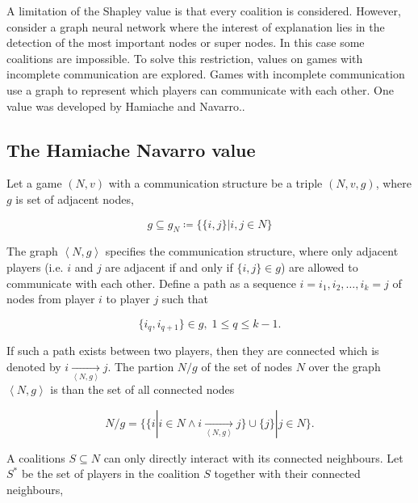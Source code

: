 \documentclass[twoside,twocolumn,9pt]{article}
\begin{document}
A limitation of the Shapley value is that every coalition is considered.\cite{zhang2022gstarx} 
However, consider a graph neural network where the interest of explanation lies in the detection 
of the most important nodes or super nodes. In this case some coalitions are impossible. To solve 
this restriction, values on games with incomplete communication\cite{myerson1977graphs} are explored. 
Games with incomplete communication use a graph to represent which players can communicate with each other.
One value was developed by Hamiache and Navarro.\cite{hamiache_value_1999, hamiache_associated_2020}.

\subsection{The Hamiache Navarro value}

Let a game $(N, v)$ with a communication structure be a triple $(N, v, g)$, where $g$ is
set of adjacent nodes\cite{hamiache_value_1999},

\begin{equation}
	g \subseteq g_N \coloneq \{ \{i, j \} | i, j \in N \}
\end{equation}

The graph $\left< N, g \right>$ specifies the communication structure, where only adjacent
players (i.e. $i$ and $j$ are adjacent if and only if $\{ i, j \} \in g$) are allowed to
communicate with each other. Define a path as a sequence $i = i_1, i_2, \dots, i_k = j$
of nodes from player $i$ to player $j$ such that

\begin{equation}
	\{i_q, i_{q+1} \} \in g, \; 1 \le q \le k - 1.
\end{equation}

If such a path exists between two players, then they are connected which is denoted by
$i \underset{\left< N, g \right>}{\rightarrow} j$. The partion $N/g$ of the set of
nodes $N$ over the graph $\left< N, g \right>$ is than the set of all connected nodes

\begin{equation}
N/g = \{\{ i | i \in N \land i \underset{\left<N, g \right>}{\rightarrow} j\} \cup \{j\} | j \in N \}.
\end{equation}

A coalitions $S \subseteq N$ can only directly interact with its connected neighbours. Let 
$S^*$ be the set of players in the coalition $S$ together with their connected neighbours, 
\end{document}
